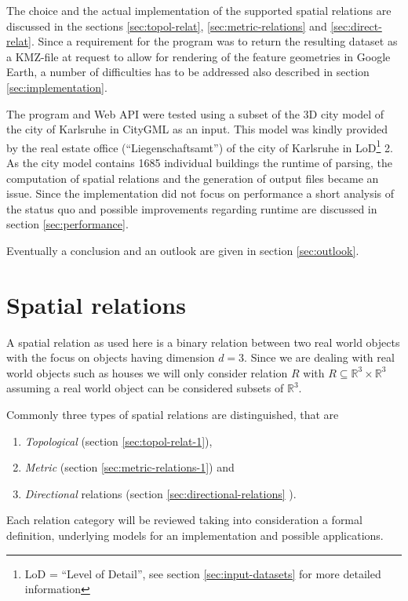 \documentclass[paper=a4, fontsize=11pt]{scrartcl} %
\numberwithin{equation}{section} %
\numberwithin{figure}{section} %
\numberwithin{table}{section} %
\begin{document}
The choice and the actual implementation of the supported spatial relations are discussed in the sections \ref{sec:topol-relat}, \ref{sec:metric-relations} and \ref{sec:direct-relat}. Since a requirement for the program was to return the resulting dataset as a KMZ-file at request to allow for rendering of the feature geometries in Google Earth, a number of difficulties has to be addressed also described in section \ref{sec:implementation}.  

The program and Web API were tested using a subset of the 3D city model of the city of Karlsruhe in CityGML as an input. This model was kindly provided by the real estate office (``Liegenschaftsamt'') of the city of Karlsruhe in LoD\footnote{LoD = ``Level of Detail'', see section \ref{sec:input-datasets} for more detailed information} 2. As the city model contains 1685 individual buildings the runtime of parsing, the computation of spatial relations and the generation of output files became an issue. Since the implementation did not focus on performance a short analysis of the status quo and possible improvements regarding runtime are discussed in section \ref{sec:performance}. 

Eventually a conclusion and an outlook are given in section \ref{sec:outlook}. 

\section{Spatial relations}\label{sec:types-geom-relat}
A spatial relation as used here is a binary relation between two real world objects with the focus on objects having dimension $d = 3$. Since we are dealing with real world objects such as houses we will only consider relation $R$ with $R \subseteq \mathbb{R}^3\times \mathbb{R}^3$ assuming a real world object can be considered subsets of $\mathbb{R}^{3}$.

Commonly three types of spatial relations are distinguished, that are
\begin{enumerate}
\item  \emph{Topological} (section \ref{sec:topol-relat-1}),
\item \emph{Metric} (section \ref{sec:metric-relations-1}) and
\item \emph{Directional} relations (section \ref{sec:directional-relations} ).
\end{enumerate}
Each relation category will be reviewed taking into consideration a formal definition, underlying models for an implementation and possible applications. 
\end{document}
